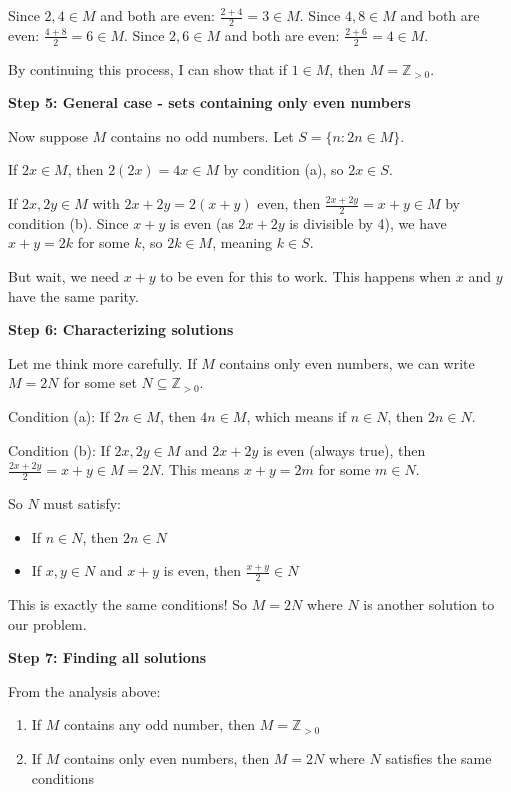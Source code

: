 \documentclass[12pt,a4paper]{article}
\theoremstyle{definition}
\begin{document}
        Since $2, 4 \in M$ and both are even: $\frac{2+4}{2} = 3 \in M$.
        Since $4, 8 \in M$ and both are even: $\frac{4+8}{2} = 6 \in M$.
        Since $2, 6 \in M$ and both are even: $\frac{2+6}{2} = 4 \in M$.

        By continuing this process, I can show that if $1 \in M$, then $M = \mathbb{Z}_{>0}$.

        \textbf{Step 5: General case - sets containing only even numbers}

        Now suppose $M$ contains no odd numbers. Let $S = \{n : 2n \in M\}$.

        If $2x \in M$, then $2(2x) = 4x \in M$ by condition (a), so $2x \in S$.

        If $2x, 2y \in M$ with $2x + 2y = 2(x+y)$ even, then $\frac{2x + 2y}{2} = x + y \in M$ by condition (b).
        Since $x + y$ is even (as $2x + 2y$ is divisible by 4), we have $x + y = 2k$ for some $k$, so $2k \in M$, meaning $k \in S$.

        But wait, we need $x + y$ to be even for this to work. This happens when $x$ and $y$ have the same parity.

        \textbf{Step 6: Characterizing solutions}

        Let me think more carefully. If $M$ contains only even numbers, we can write $M = 2N$ for some set $N \subseteq \mathbb{Z}_{>0}$.

        Condition (a): If $2n \in M$, then $4n \in M$, which means if $n \in N$, then $2n \in N$.

        Condition (b): If $2x, 2y \in M$ and $2x + 2y$ is even (always true), then $\frac{2x + 2y}{2} = x + y \in M = 2N$.
        This means $x + y = 2m$ for some $m \in N$.

        So $N$ must satisfy:
        \begin{itemize}
            \item If $n \in N$, then $2n \in N$
            \item If $x, y \in N$ and $x + y$ is even, then $\frac{x+y}{2} \in N$
        \end{itemize}

        This is exactly the same conditions! So $M = 2N$ where $N$ is another solution to our problem.

        \textbf{Step 7: Finding all solutions}

        From the analysis above:
        \begin{enumerate}
            \item If $M$ contains any odd number, then $M = \mathbb{Z}_{>0}$
            \item If $M$ contains only even numbers, then $M = 2N$ where $N$ satisfies the same conditions
        \end{enumerate}
\end{document}
